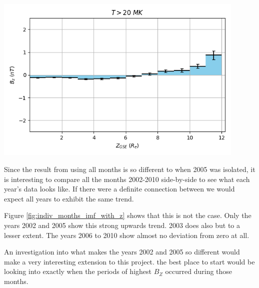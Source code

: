 \documentclass[12pt]{article}
\newenvironment{Figure}
  {\par\medskip\noindent\minipage{\linewidth}}
  {\endminipage\par\medskip}
\begin{document}
\begin{Figure}
    \begin{minipage}[c]{0.57\textwidth}
        \centering
        \includegraphics[width=0.9\textwidth]{imf_with_z.png}
    \end{minipage}
    \begin{minipage}[c]{0.4\textwidth}
        \label{fig:imf_with_z}
    \end{minipage}
\end{Figure}

Since the result from using all months is so different to when 2005 was isolated, it is interesting to compare all the months 2002-2010 side-by-side to see what each year's data looks like. If there were a definite connection between we would expect all years to exhibit the same trend.

Figure \ref{fig:indiv_months_imf_with_z} shows that this is not the case. Only the years 2002 and 2005 show this strong upwards trend. 2003 does also but to a lesser extent. The years 2006 to 2010 show almost no deviation from zero at all.

An investigation into what makes the years 2002 and 2005 so different would make a very interesting extension to this project. the best place to start would be looking into exactly when the periods of highest $B_Z$ occurred during those months.
\end{document}

